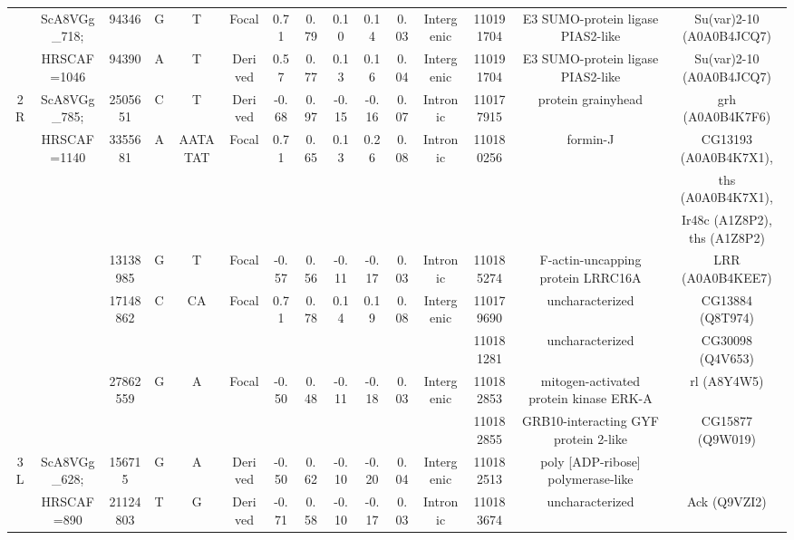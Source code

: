 \begin{landscape}
\begin{table}[!htp]
\begin{center}
\begin{tabular}{ccS[table-format=8.0]cccS[table-format=1.2]S[table-format=1.2]S[table-format=1.2]S[table-format=1.2]S[table-format=1.2]cccc}
 & 	
 ScA8VGg\_718; & 94346 & G & T & Focal & 0.71 & 0.79 & 0.10 & 0.14 & 0.03 & Intergenic & 110191704 & E3 SUMO-protein ligase PIAS2-like & Su(var)2-10 (A0A0B4JCQ7)\\
 & 	
 HRSCAF=1046 & 94390 & A & T & Derived & 0.57 & 0.77 & 0.13 & 0.16 & 0.04 & Intergenic & 110191704 & E3 SUMO-protein ligase PIAS2-like & Su(var)2-10 (A0A0B4JCQ7)\\
 \midrule
2R & ScA8VGg\_785; & 2505651 & C & T & Derived & -0.68 & 0.97 & -0.15 & -0.16 & 0.07 & Intronic & 110177915 & protein grainyhead & grh (A0A0B4K7F6)\\
 & HRSCAF=1140 & 3355681 & A & AATATAT & Focal & 0.71 & 0.65 & 0.13 & 0.26 & 0.08 & Intronic & 110180256 & formin-J & CG13193 (A0A0B4K7X1),\\
 &  &  &  &  &  &  &  &  &  &  &  &  &  & ths (A0A0B4K7X1),\\
 &  &  &  &  &  &  &  &  &  &  &  &  &  & Ir48c (A1Z8P2), ths (A1Z8P2)\\
 &  & 13138985 & G & T & Focal & -0.57 & 0.56 & -0.11 & -0.17 & 0.03 & Intronic & 110185274 & F-actin-uncapping protein LRRC16A & LRR (A0A0B4KEE7)\\
 &  & 17148862 & C & CA & Focal & 0.71 & 0.78 & 0.14 & 0.19 & 0.08 & Intergenic & 110179690 & uncharacterized & CG13884 (Q8T974)\\
 &  &  &  &  &  &  &  &  &  &  &  & 110181281 & uncharacterized & CG30098 (Q4V653)\\
 &  & 27862559 & G & A & Focal & -0.50 & 0.48 & -0.11 & -0.18 & 0.03 & Intergenic & 110182853 & mitogen-activated protein kinase ERK-A & rl (A8Y4W5)\\
 &  &  &  &  &  &  &  &  &  &  &  & 110182855 & GRB10-interacting GYF protein 2-like & CG15877 (Q9W019)\\
 \midrule
3L & ScA8VGg\_628; & 156715 & G & A & Derived & -0.50 & 0.62 & -0.10 & -0.20 & 0.04 & Intergenic & 110182513 & poly [ADP-ribose] polymerase-like & \\
 & HRSCAF=890 & 21124803 & T & G & Derived & -0.71 & 0.58 & -0.10 & -0.17 & 0.03 & Intronic & 110183674 & uncharacterized & Ack (Q9VZI2)\\

\end{tabular}
\end{center}
\end{table}
\end{landscape}

